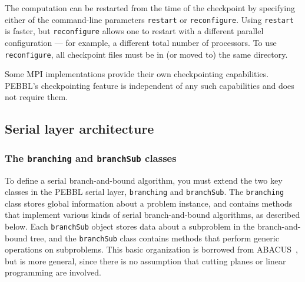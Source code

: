 The computation can be restarted from the time of the checkpoint by
specifying either of the command-line parameters \texttt{restart} or
\texttt{reconfigure}.  Using \texttt{restart} is faster, but
\texttt{reconfigure} allows one to restart with a different parallel
configuration --- for example, a different total number of processors.
To use \texttt{reconfigure}, all checkpoint files must be in (or moved
to) the same directory.

Some MPI implementations provide their own checkpointing capabilities.
PEBBL's checkpointing feature is independent of any such capabilities
and does not require them.  




\subsection{Serial layer architecture}

\subsubsection{The \texttt{branching} and \texttt{branchSub} classes}

To define a serial branch-and-bound algorithm, you must extend the two
key classes in the PEBBL serial layer, \texttt{branching} and
\texttt{branchSub}.  The \texttt{branching} class stores global
information about a problem instance, and contains methods that
implement various kinds of serial branch-and-bound algorithms, as
described below.  Each \texttt{branchSub} object stores data about a
subproblem in the branch-and-bound tree, and the \texttt{branchSub}
class contains methods that perform generic operations on subproblems.
This basic organization is borrowed from ABACUS~\cite{JT98}, but is
more general, since there is no assumption that cutting planes or
linear programming are involved.

